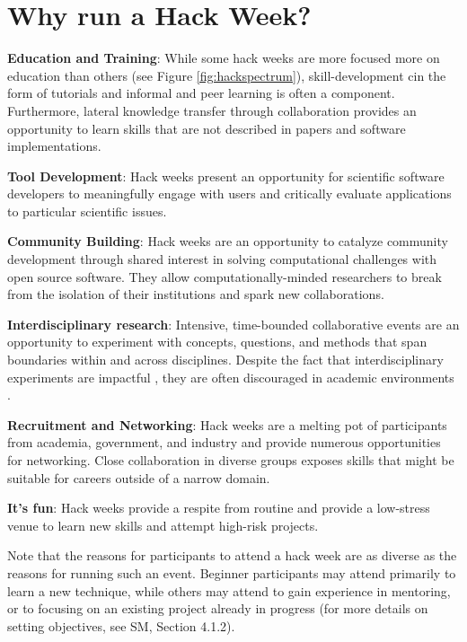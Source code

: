 \section*{Why run a Hack Week?}

\noindent\textbf{Education and Training}: While some hack weeks are more focused more on education than others (see Figure \ref{fig:hackspectrum}), skill-development cin the form of tutorials and informal and peer learning is often a component. Furthermore, lateral knowledge transfer \cite{b:wilson-swc-lessons-2016} through collaboration provides an opportunity to learn skills that are not described in papers and software implementations.

\noindent\textbf{Tool Development}: Hack weeks present an opportunity for scientific software developers to meaningfully engage with users and critically evaluate applications to particular scientific issues.

\noindent\textbf{Community Building}: Hack weeks are an opportunity to catalyze community development through shared interest in solving computational challenges with open source software. They allow computationally-minded researchers to break from the isolation of their institutions and spark new collaborations.

\noindent\textbf{Interdisciplinary research}: Intensive, time-bounded collaborative events are an opportunity to experiment with concepts, questions, and methods that span boundaries within and across disciplines. Despite the fact that interdisciplinary experiments are impactful \cite{Hall2012-hi}, they are often discouraged in academic environments \cite{Sung2003-go}.

\noindent\textbf{Recruitment and Networking}: Hack weeks are a melting pot of participants from academia, government, and industry and provide numerous opportunities for networking. Close collaboration in diverse groups exposes skills that might be suitable for careers outside of a narrow domain.

\noindent\textbf{It's fun}: Hack weeks provide a respite from routine and provide a low-stress venue to learn new skills and attempt high-risk projects.

\noindent Note that the reasons for participants to attend a hack week are as diverse as the reasons for running such an event.
Beginner participants may attend primarily to learn a new technique, while others may attend to gain experience in mentoring, or to focusing on an existing project already in progress (for more details on setting objectives, see SM, Section 4.1.2).
